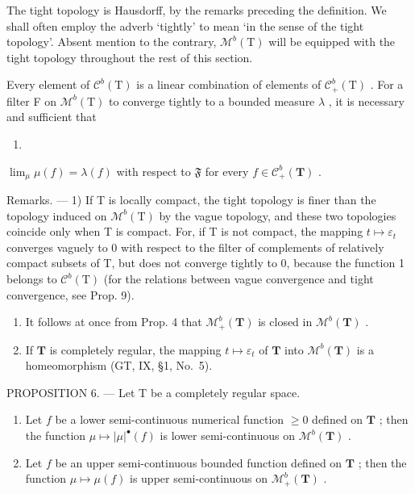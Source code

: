 The tight topology is Hausdorff, by the remarks preceding the definition. We shall often employ the adverb `tightly' to mean `in the sense of the tight topology'. Absent mention to the contrary, \(\mathcal{M}^b (\mathrm{T})\) will be equipped with the tight topology throughout the rest of this section.

Every element of \(\mathcal{C}^{b}(\mathrm{T})\) is a linear combination of elements of \(\mathcal{C}_{+}^{b}(\mathrm{T})\) . For a filter F on \(\mathcal{M}^{b}(\mathrm{T})\) to converge tightly to a bounded measure \(\lambda\) , it is necessary and sufficient that

\begin{enumerate}
\def\labelenumi{(\arabic{enumi})}
\setcounter{enumi}{3}
\tightlist
\item
\end{enumerate}

\(\lim_{\mu} \mu(f) = \lambda(f)\) with respect to \(\mathfrak{F}\) for every \(f \in \mathcal{C}_+^b(\mathbf{T})\) .

Remarks. --- 1) If T is locally compact, the tight topology is finer than the topology induced on \(\mathcal{M}^{b}(\mathrm{T})\) by the vague topology, and these two topologies coincide only when T is compact. For, if T is not compact, the mapping \(t \mapsto \varepsilon_{t}\) converges vaguely to 0 with respect to the filter of complements of relatively compact subsets of T, but does not converge tightly to 0, because the function 1 belongs to \(\mathcal{C}^{b}(\mathrm{T})\) (for the relations between vague convergence and tight convergence, see Prop. 9).

\begin{enumerate}
\def\labelenumi{\arabic{enumi})}
\setcounter{enumi}{1}
\item
  It follows at once from Prop. 4 that \(\mathcal{M}_+^b (\mathbf{T})\) is closed in \(\mathcal{M}^b (\mathbf{T})\) .
\item
  If \(\mathbf{T}\) is completely regular, the mapping \(t \mapsto \varepsilon_t\) of \(\mathbf{T}\) into \(\mathcal{M}^b(\mathbf{T})\) is a homeomorphism (GT, IX, §1, No.~5).
\end{enumerate}

PROPOSITION 6. --- Let T be a completely regular space.

\begin{enumerate}
\def\labelenumi{\alph{enumi})}
\item
  Let \(f\) be a lower semi-continuous numerical function \(\geqslant 0\) defined on \(\mathbf{T}\) ; then the function \(\mu \mapsto |\mu|^{\bullet}(f)\) is lower semi-continuous on \(\mathcal{M}^b(\mathbf{T})\) .
\item
  Let \(f\) be an upper semi-continuous bounded function defined on \(\mathbf{T}\) ; then the function \(\mu \mapsto \mu(f)\) is upper semi-continuous on \(\mathcal{M}_+^b(\mathbf{T})\) .
\end{enumerate}

